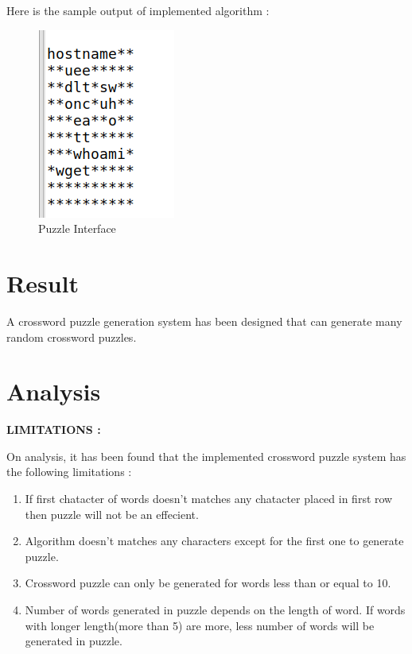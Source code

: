 \vspace*{6 ex}
Here is the sample output of implemented algorithm :

\begin{figure}[!ht]
\centering
\includegraphics[scale=0.6]{algo.png}
\caption{\label{img5} Puzzle Interface }
\end{figure}



\section{Result}
A crossword puzzle generation system has been designed that can generate many random crossword puzzles.

\vspace*{2 ex}
\section{Analysis}
\textbf{LIMITATIONS :}


On analysis, it has been found that the implemented crossword puzzle system has the following limitations :\vspace*{2 ex}
\begin{enumerate}
\item If first chatacter of words doesn't matches any chatacter placed in first row then puzzle will not be an effecient.
\item Algorithm doesn't matches any characters except for the first one to generate puzzle.
\item Crossword puzzle can only be generated for words less than or equal to 10.
\item Number of words generated in puzzle depends on the length of word. If words with longer length(more than 5) are more, less number of words will be generated  in puzzle. 
\end{enumerate}


